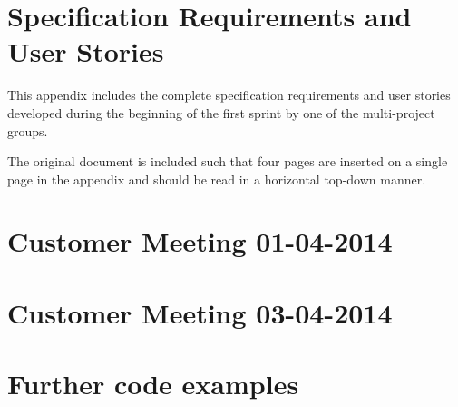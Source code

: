 \chapter{Specification Requirements and User Stories}\label{appendix:requirements}
This appendix includes the complete specification requirements and user stories developed during the beginning of the first sprint by one of the multi-project groups.

The original document is included such that four pages are inserted on a single page in the appendix and should be read in a horizontal top-down manner.



\chapter{Customer Meeting 01-04-2014}\label{appendix:firstmeeting}



\chapter{Customer Meeting 03-04-2014}\label{appendix:secondmeeting}


\chapter{Further code examples}\label{appendix:codeexamples}
